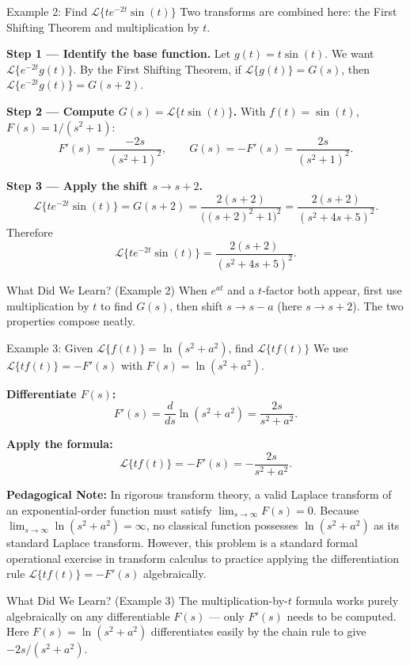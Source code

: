 \documentclass[12pt,a4paper]{article}
\begin{document}
\begin{infobox}{Example 2: Find $\mathcal{L}\{te^{-2t}\sin(t)\}$}
Two transforms are combined here: the First Shifting Theorem and multiplication
by $t$.

\textbf{Step 1 --- Identify the base function.}
Let $g(t)=t\sin(t)$. We want $\mathcal{L}\{e^{-2t}g(t)\}$.
By the First Shifting Theorem, if $\mathcal{L}\{g(t)\}=G(s)$, then
$\mathcal{L}\{e^{-2t}g(t)\}=G(s+2)$.

\textbf{Step 2 --- Compute $G(s)=\mathcal{L}\{t\sin(t)\}$.}
With $f(t)=\sin(t)$, $F(s)=1/(s^2+1)$:
\[
  F'(s) = \frac{-2s}{(s^2+1)^2}, \qquad
  G(s) = -F'(s) = \frac{2s}{(s^2+1)^2}.
\]

\textbf{Step 3 --- Apply the shift $s \to s+2$.}
\[
  \mathcal{L}\{te^{-2t}\sin(t)\} = G(s+2)
  = \frac{2(s+2)}{\bigl((s+2)^2+1\bigr)^2}
  = \frac{2(s+2)}{(s^2+4s+5)^2}.
\]
Therefore
\[
  \boxed{\mathcal{L}\{te^{-2t}\sin(t)\} = \frac{2(s+2)}{(s^2+4s+5)^2}.}
\]
\end{infobox}
\begin{learnbox}{What Did We Learn? (Example 2)}
When $e^{at}$ and a $t$-factor both appear, first use multiplication by $t$ to
find $G(s)$, then shift $s \to s-a$ (here $s \to s+2$). The two properties
compose neatly.
\end{learnbox}

\begin{infobox}{Example 3: Given $\mathcal{L}\{f(t)\}=\ln(s^2+a^2)$, find $\mathcal{L}\{tf(t)\}$}
We use $\mathcal{L}\{tf(t)\}=-F'(s)$ with $F(s)=\ln(s^2+a^2)$.

\textbf{Differentiate $F(s)$:}
\[
  F'(s) = \frac{d}{ds}\ln(s^2+a^2) = \frac{2s}{s^2+a^2}.
\]

\textbf{Apply the formula:}
\[
  \mathcal{L}\{tf(t)\} = -F'(s) = -\frac{2s}{s^2+a^2}.
\]

\textbf{Pedagogical Note:} In rigorous transform theory, a valid Laplace transform of an exponential-order function must satisfy $\lim_{s \to \infty} F(s) = 0$. Because $\lim_{s \to \infty} \ln(s^2+a^2) = \infty$, no classical function possesses $\ln(s^2+a^2)$ as its standard Laplace transform. However, this problem is a standard formal operational exercise in transform calculus to practice applying the differentiation rule $\mathcal{L}\{tf(t)\} = -F'(s)$ algebraically.
\end{infobox}
\begin{learnbox}{What Did We Learn? (Example 3)}
The multiplication-by-$t$ formula works purely algebraically on any differentiable $F(s)$ --- only $F'(s)$ needs to be computed. Here $F(s)=\ln(s^2+a^2)$ differentiates easily by the chain rule to give $-2s/(s^2+a^2)$.
\end{learnbox}
\end{document}

